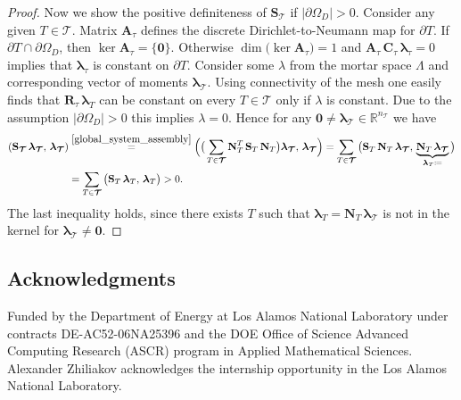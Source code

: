 \documentclass[12pt]{article}
\newcommand{\vect}[1]{\boldsymbol{\mathbf{#1}}}
\newcommand{\bcell}{T}
\newcommand{\bmesh}{{\vect{\mathcal T}}}
\newcommand{\mmesh}{{\vect{\mathcal \tau}}}
\DeclareMathOperator{\Ker}{ker}
\DeclareMathOperator{\Dim}{dim}
\begin{document}
\begin{proof}
		Now we show the positive definiteness of $\vect S_\bmesh$ if $|\partial\Omega_D|>0 $. Consider  any given $\bcell\in\bmesh$.
		Matrix  $\vect A_{\mmesh}$ defines the discrete Dirichlet-to-Neumann map for $\partial\bcell$.
		If $\partial\bcell\cap\partial\Omega_D$, then $\Ker \vect A_{\mmesh} = \{\vect 0\}$. Otherwise $\Dim\big(\Ker \vect A_{\mmesh}\big) = 1$ and $\vect A_{\mmesh}\,\vect C_{\mmesh}\,\vect\lambda_\mmesh=0$ implies that $\vect\lambda_\mmesh$ is constant on $\partial\bcell$. Consider some $\lambda$ from the mortar space $\Lambda$ and corresponding vector of moments  $\vect \lambda_\bmesh$. Using connectivity of the mesh one easily finds that $\vect R_\mmesh\,\vect\lambda_\bcell$ can be constant on every $T\in\bmesh$ only if $\lambda$ is constant. Due to the assumption $|\partial\Omega_D|>0$ this implies $\lambda=0$.
		Hence for any $\vect0\neq\vect\lambda_\bmesh\in \mathbb{R}^{n_\bmesh}$ we have
		\begin{align*}
		\left(\vect S_\bmesh\,\vect\lambda_\bmesh,\,\vect\lambda_\bmesh\right) &\stackrel{\eqref{global_system_assembly}}{=}
		\Big( \big( \sum_{\bcell \in \bmesh} \vect N^T_\bcell\,\vect S_\bcell\,\vect N_\bcell \big){\vect\lambda_\bmesh},\,{\vect\lambda_\bmesh} \Big) =
		\sum_{\bcell \in \bmesh} \big( \vect S_\bcell\,\vect N_\bcell\,{\vect\lambda_\bmesh},\,\underbrace{\vect N_\bcell\,{\vect\lambda_\bmesh}}_{{\vect \lambda_\bcell} \coloneqq} \big) \\
		& = \sum_{\bcell \in \bmesh} \big(\vect S_\bcell\,{\vect \lambda_\bcell},\,{\vect \lambda_\bcell} \big) > 0.
		\end{align*}
		The last inequality holds, since there exists $\bcell$ such that $\vect \lambda_\bcell=\vect N_\bcell\,{\vect\lambda_\bmesh}$ is not in the kernel for $\vect\lambda_\bmesh\neq\vect0$.
	\end{proof}

	
	
	\subsection*{Acknowledgments} 
        Funded by the Department of Energy at Los Alamos National Laboratory
        under contracts DE-AC52-06NA25396 and the DOE Office of Science
        Advanced Computing Research (ASCR) program in Applied Mathematical
        Sciences. Alexander Zhiliakov acknowledges the internship opportunity in the Los Alamos National Laboratory.
	
	
	
\end{document}
